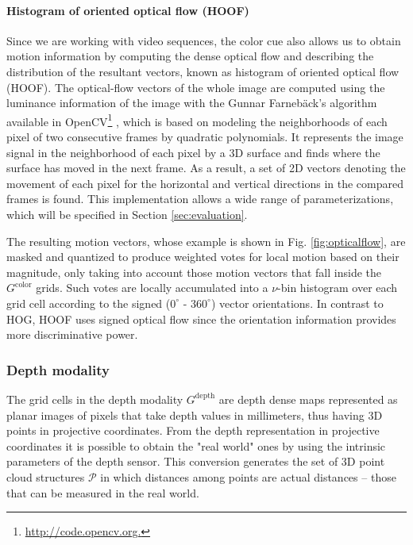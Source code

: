 \documentclass[10pt,twocolumn,letterpaper]{article}
\begin{document}
\paragraph{Histogram of oriented optical flow (HOOF)} 
Since we are working with video sequences, the color cue also allows us to obtain motion information by computing the dense optical flow and describing the distribution of the resultant vectors, known as histogram of oriented optical flow (HOOF)\cite{dalal2006human}. The optical-flow vectors of the whole image are computed using the luminance information of the image with the Gunnar Farneb\"{a}ck's algorithm \cite{farneback2003two} available in OpenCV\footnote{\url{http://code.opencv.org.}} \cite{bradski2008learning}, which is based on modeling the neighborhoods of each pixel of two consecutive frames by quadratic polynomials. It represents the image signal in the neighborhood of each pixel by a 3D surface and finds where the surface has moved in the next frame. As a result, a set of 2D vectors denoting the movement of each pixel for the horizontal and vertical directions in the compared frames is found. This implementation allows a wide range of parameterizations, which will be specified in Section \ref{sec:evaluation}.

 The resulting motion vectors, whose example is shown in Fig. \ref{fig:opticalflow}, are masked and quantized to produce weighted votes for local motion based on their magnitude, only taking into account those motion vectors that fall inside the $G^\mathrm{color}$ grids. Such votes are locally accumulated into a $\nu$-bin histogram over each grid cell according to the signed ($0^\circ$ - $360^\circ$) vector orientations. In contrast to HOG, HOOF uses signed optical flow since the orientation information provides more discriminative power. 
 

\subsubsection{Depth modality}
\label{sssec:depth}

The grid cells in the depth modality $G^\mathrm{depth}$ are depth dense maps represented as planar images of pixels that take depth values in millimeters, thus having 3D points in projective coordinates. From the depth representation in projective coordinates it is possible to obtain the "real world" ones by using the intrinsic parameters of the depth sensor. This conversion generates the set of 3D point cloud structures $\mathcal{P}$ in which distances among points are actual distances -- those that can be measured in the real world. 
\end{document}
